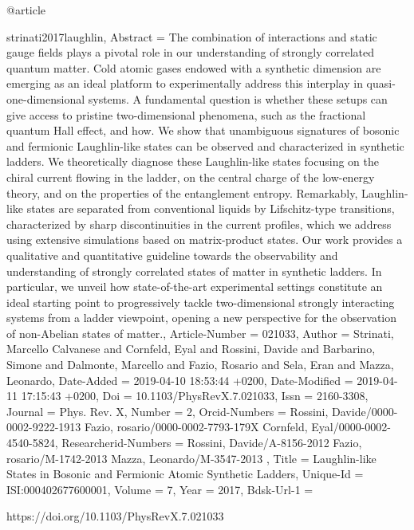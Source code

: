 \documentclass[epj,final]{svjour}
\begin{document}
{{{{{{{{{{{@article{strinati2017laughlin,
	Abstract = {{The combination of interactions and static gauge fields plays a pivotal
   role in our understanding of strongly correlated quantum matter. Cold
   atomic gases endowed with a synthetic dimension are emerging as an ideal
   platform to experimentally address this interplay in
   quasi-one-dimensional systems. A fundamental question is whether these
   setups can give access to pristine two-dimensional phenomena, such as
   the fractional quantum Hall effect, and how. We show that unambiguous
   signatures of bosonic and fermionic Laughlin-like states can be observed
   and characterized in synthetic ladders. We theoretically diagnose these
   Laughlin-like states focusing on the chiral current flowing in the
   ladder, on the central charge of the low-energy theory, and on the
   properties of the entanglement entropy. Remarkably, Laughlin-like states
   are separated from conventional liquids by Lifschitz-type transitions,
   characterized by sharp discontinuities in the current profiles, which we
   address using extensive simulations based on matrix-product states. Our
   work provides a qualitative and quantitative guideline towards the
   observability and understanding of strongly correlated states of matter
   in synthetic ladders. In particular, we unveil how state-of-the-art
   experimental settings constitute an ideal starting point to
   progressively tackle two-dimensional strongly interacting systems from a
   ladder viewpoint, opening a new perspective for the observation of
   non-Abelian states of matter.}},
	Article-Number = {{021033}},
	Author = {Strinati, Marcello Calvanese and Cornfeld, Eyal and Rossini, Davide and Barbarino, Simone and Dalmonte, Marcello and Fazio, Rosario and Sela, Eran and Mazza, Leonardo},
	Date-Added = {2019-04-10 18:53:44 +0200},
	Date-Modified = {2019-04-11 17:15:43 +0200},
	Doi = {{10.1103/PhysRevX.7.021033}},
	Issn = {{2160-3308}},
	Journal = {Phys. Rev. X},
	Number = {{2}},
	Orcid-Numbers = {{Rossini, Davide/0000-0002-9222-1913 Fazio, rosario/0000-0002-7793-179X Cornfeld, Eyal/0000-0002-4540-5824}},
	Researcherid-Numbers = {{Rossini, Davide/A-8156-2012 Fazio, rosario/M-1742-2013 Mazza, Leonardo/M-3547-2013 }},
	Title = {{Laughlin-like States in Bosonic and Fermionic Atomic Synthetic Ladders}},
	Unique-Id = {{ISI:000402677600001}},
	Volume = {{7}},
	Year = {{2017}},
	Bdsk-Url-1 = {https://doi.org/10.1103/PhysRevX.7.021033

}}}}}}}}}}}}}
\end{document}
